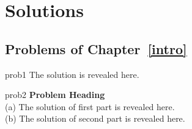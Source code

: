 
\chapter*{Solutions}

\section*{Problems of Chapter~\ref{intro}}

\begin{sol}{prob1}
The solution is revealed here.
\end{sol}


\begin{sol}{prob2}
\textbf{Problem Heading}\\
(a) The solution of first part is revealed here.\\
(b) The solution of second part is revealed here.
\end{sol}

